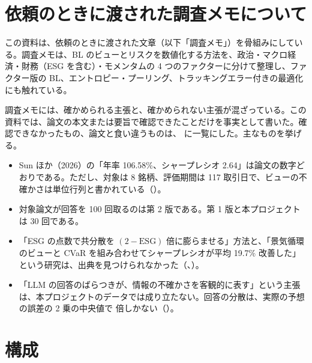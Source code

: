 \section*{依頼のときに渡された調査メモについて}

この資料は、依頼のときに渡された文章（以下「調査メモ」）を骨組みにしている。調査メモは、BL のビューとリスクを数値化する方法を、政治・マクロ経済・財務（ESG を含む）・モメンタムの 4 つのファクターに分けて整理し、ファクター版の BL、エントロピー・プーリング、トラッキングエラー付きの最適化にも触れている。

調査メモには、確かめられる主張と、確かめられない主張が混ざっている。この資料では、論文の本文または要旨で確認できたことだけを事実として書いた。確認できなかったもの、論文と食い違うものは、 に一覧にした。主なものを挙げる。

\begin{itemize}
\item Sun ほか（2026）の「年率 106.58\%、シャープレシオ 2.64」は論文の数字どおりである。ただし、対象は 8 銘柄、評価期間は 117 取引日で、ビューの不確かさは単位行列と書かれている（）。
\item 対象論文が回答を 100 回取るのは第 2 版である。第 1 版と本プロジェクトは 30 回である。
\item 「ESG の点数で共分散を $(2-\mathrm{ESG})$ 倍に膨らませる」方法と、「景気循環のビューと CVaR を組み合わせてシャープレシオが平均 19.7\% 改善した」という研究は、出典を見つけられなかった（、）。
\item 「LLM の回答のばらつきが、情報の不確かさを客観的に表す」という主張は、本プロジェクトのデータでは成り立たない。回答の分散は、実際の予想の誤差の 2 乗の中央値で  倍しかない（）。
\end{itemize}

\section*{構成}

